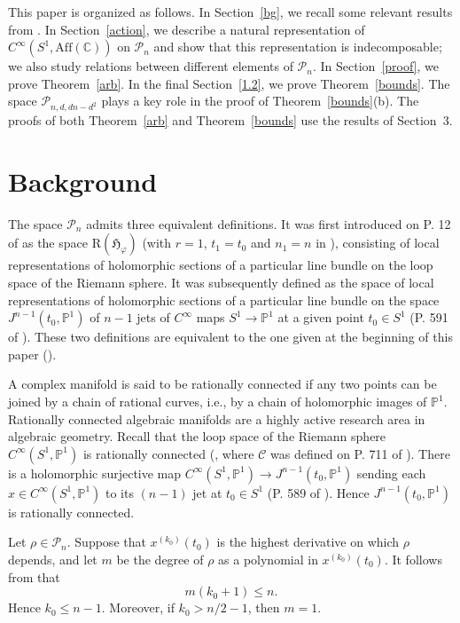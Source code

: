 \documentclass[11pt]{amsart}
\numberwithin{equation}{section}
\newcommand{\bp}{\mathbb{P}}
\newcommand{\scp}{\mathscr{P}}
\newcommand{\jnmpo}{J^{n-1}\left(t_0, \mathbb{P}^1\right)}
\newcommand{\pn}{\mathscr{P}_{n}}
\newcommand{\aff}{\mathrm{Aff}(\mathbb{C})}
\begin{document}
This paper is organized as follows.  In Section~\ref{bg}, we recall some relevant results from \cite{z03,wz}. In Section~\ref{action}, we describe a natural representation of $C^{\infty}(S^1,\aff)$ on $\pn$ and show that this representation is indecomposable; we also study relations between different elements of $\pn$. In Section~\ref{proof}, we prove Theorem~\ref{arb}. In the final Section~\ref{1.2}, we prove Theorem~\ref{bounds}. The space $\scp_{n,d,dn-d^2}$ plays a key role in the proof of Theorem~\ref{bounds}(b). The proofs of both Theorem~\ref{arb} and Theorem~\ref{bounds} use the results of Section~3.


\section{Background \label{bg}}


The space $\pn$ admits three equivalent definitions. It was first introduced on P. 12 of \cite{z03}
as the space $\mathrm{R}(\mathfrak{H}_{\varphi})$ (with $r=1$, $t_1=t_0$ and
$n_1=n$ in \cite[(4.1)]{z03}), consisting of
local representations of holomorphic sections of a particular line bundle
on the loop space of the Riemann sphere.
It was subsequently defined as the space of local representations of holomorphic sections of a particular
line bundle on the space $\jnmpo$ of $n-1$ jets of $C^{\infty}$
maps $S^1 \to \bp^1$ at a given point $t_0 \in S^1$ (P. 591 of \cite{wz}).
These two definitions are equivalent to the one given at the beginning of this paper (\cite[Section 2]{wz}).

A complex manifold is said to be rationally connected if any two points can be joined by a chain of rational curves, i.e., by a chain of holomorphic images of $\mathbb{P}^1$.
Rationally connected algebraic manifolds are a highly active research area in algebraic geometry.
Recall that the loop space of the Riemann sphere $C^{\infty}(S^1, \bp^1)$ is rationally connected
(\cite[Proposition 3.3]{z17}, where $\mathscr{C}$ was defined on P. 711 of \cite{z17}).
There is a holomorphic surjective map $C^{\infty}(S^1, \bp^1) \to \jnmpo$ sending each $x \in C^{\infty}(S^1, \bp^1)$
to its $(n-1)$ jet at $t_0 \in S^1$ (P. 589 of \cite{wz}). Hence $\jnmpo$
is rationally connected.

Let $\rho\in\pn$. Suppose that $x^{(k_0)}(t_0)$ is the highest derivative on which $\rho$ depends, and let $m$ be the degree of $\rho$ as a polynomial in $x^{(k_0)}(t_0)$. It follows from \cite[Proposition 4.3]{z03} that
\begin{equation}\label{highest}
    m(k_0+1)\le n.
\end{equation}
Hence $k_0\le n-1$. Moreover, if $k_0>n/2-1$, then $m=1$.
\end{document}
